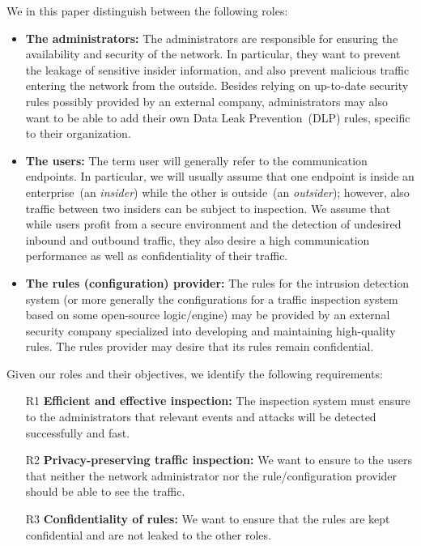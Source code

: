 \documentclass{sig-alternate-10pt}
\begin{document}
We in this paper distinguish between
the following roles:
\begin{itemize}
\item \textbf{The administrators:} The administrators 
are responsible for ensuring the availability and security of the network.
In particular, they want to prevent the leakage of sensitive insider information, 
and also prevent malicious traffic entering the network from the outside.
Besides relying on up-to-date security rules
possibly provided by an external company, 
administrators may also want to be able to add 
their own Data
Leak Prevention~(DLP) rules, specific to their
organization.

\item \textbf{The users:} 
The term user will generally refer to the communication endpoints.
In particular, we will usually assume that one endpoint is inside 
an enterprise~(an \emph{insider}) while the other is outside~(an 
\emph{outsider}); however, also traffic between two insiders can be subject to inspection. 
We assume that while users profit from a secure environment and 
the detection of undesired inbound and outbound traffic, 
 they also desire a high 
communication performance as well as confidentiality of their traffic. 

\item \textbf{The rules (configuration) provider:} The rules 
for the intrusion detection system
(or more generally the configurations for a traffic inspection system based on 
some open-source logic/engine)
may be provided by an external security company
specialized into developing and maintaining high-quality rules.
The rules provider may desire that its rules remain confidential.
\end{itemize}

Given our roles and their objectives, 
we identify the following requirements:
\begin{enumerate}
\item[R1] \textbf{Efficient and effective inspection:}
The inspection system must 
ensure to the administrators that relevant events and attacks will be detected
successfully and fast.

\item[R2] \textbf{Privacy-preserving traffic inspection:} 
We want to ensure to the users that neither the network administrator nor the rule/configuration provider
should be able to see the traffic. 

\item[R3] \textbf{Confidentiality of rules:} 
We want to ensure that the rules are kept confidential
and are not leaked to the other roles.
\end{enumerate}
\end{document}

